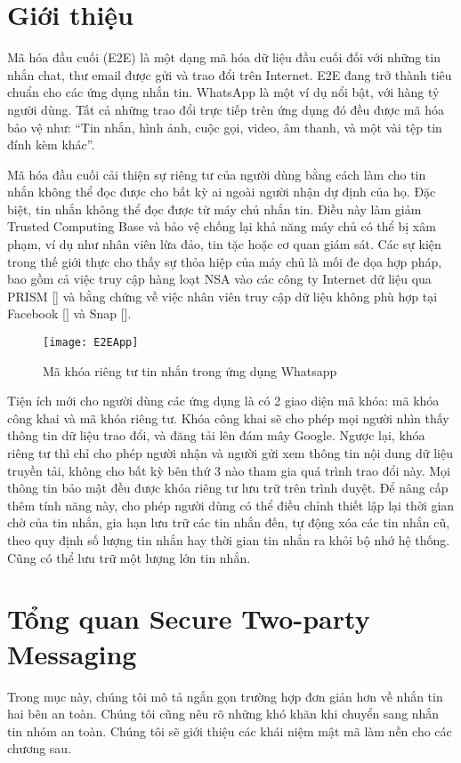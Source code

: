 \documentclass[../main-report.tex]{subfiles}
\begin{document}
\section{Giới thiệu}
Mã hóa đầu cuối (E2E) là một dạng mã hóa dữ liệu đầu cuối đối với những tin nhắn chat, thư email được gửi và trao đổi trên Internet. E2E đang trở thành tiêu chuẩn cho các ứng dụng nhắn tin. WhatsApp là một ví dụ nổi bật, với hàng tỷ người dùng. Tất cả những trao đổi trực tiếp trên ứng dụng đó đều được mã hóa bảo vệ như: “Tin nhắn, hình ảnh, cuộc gọi, video, âm thanh, và một vài tệp tin đính kèm khác”.

Mã hóa đầu cuối cải thiện sự riêng tư của người dùng bằng cách làm cho tin nhắn không thể đọc được cho bất kỳ ai ngoài người nhận dự định của họ. Đặc biệt, tin nhắn không thể đọc được từ máy chủ nhắn tin. Điều này làm giảm \gls{Trusted Computing Base} và bảo vệ chống lại khả năng máy chủ có thể bị xâm phạm, ví dụ như nhân viên lừa đảo, tin tặc hoặc cơ quan giám sát. Các sự kiện trong thế giới thực cho thấy sự thỏa hiệp của máy chủ là mối đe dọa hợp pháp, bao gồm cả việc truy cập hàng loạt NSA vào các công ty Internet dữ liệu qua PRISM [\cite{7}] và bằng chứng về việc nhân viên truy cập dữ liệu không phù hợp tại Facebook [\cite{8}] và Snap [\cite{9}].

\begin{figure}[ht!]
\begin{center}
\label{fig:E2E}
\texttt{[image: E2EApp]}
\caption{Mã khóa riêng tư tin nhắn trong ứng dụng Whatsapp}
\end{center}
\end{figure}

Tiện ích mới cho người dùng các ứng dụng là có 2 giao diện mã khóa: mã khóa công khai và mã khóa riêng tư. Khóa công khai sẽ cho phép mọi người nhìn thấy thông tin dữ liệu trao đổi, và đăng tải lên đám mây Google. Ngược lại, khóa riêng tư thì chỉ cho phép người nhận và người gửi xem thông tin nội dung dữ liệu truyền tải, không cho bất kỳ bên thứ 3 nào tham gia quá trình trao đổi này. Mọi thông tin bảo mật đều được khóa riêng tư lưu trữ trên trình duyệt. Để nâng cấp thêm tính năng này, cho phép người dùng có thể điều chỉnh thiết lập lại thời gian chờ của tin nhắn, gia hạn lưu trữ các tin nhắn đến, tự động xóa các tin nhắn cũ, theo quy định số lượng tin nhắn hay thời gian tin nhắn ra khỏi bộ nhớ hệ thống. Cũng có thể lưu trữ một lượng lớn tin nhắn.


\section{Tổng quan Secure Two-party Messaging}
\label{sec:related-work}
Trong mục này, chúng tôi mô tả ngắn gọn trường hợp đơn giản hơn về nhắn tin hai bên an toàn. Chúng tôi cũng nêu rõ những khó khăn khi chuyển sang nhắn tin nhóm an toàn. Chúng tôi sẽ giới thiệu các khái niệm mật mã làm nền cho các chương sau.
\end{document}
